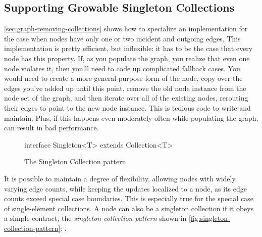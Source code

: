 \subsection{Supporting Growable Singleton Collections}

\autoref{sec:graph-removing-collections} shows how to specialize an
implementation for the case when nodes have only one or two incident and
outgoing edges. This implementation is pretty efficient, but inflexible: it has
to be the case that every node has this property. If, as you populate the graph,
you realize that even one node violates it, then you'll need to code up
complicated fallback cases. You would need to create a more general-purpose form
of the node, copy over the edges you've added up until this point, remove the
old node instance from the node set of the graph, and then iterate over all of
the existing nodes, rerouting their edges to point to the new node instance.
This is tedious code to write and maintain. Plus, if this happens even
moderately often while populating the graph, can result in bad performance.


\begin{figure}
\centering
\begin{framedlisting}
interface Singleton<T> extends Collection<T> {
}
\end{framedlisting}
\caption{The Singleton Collection pattern.}
\label{fig:singleton-collection-pattern}
\end{figure}
It is possible to maintain a degree of flexibility, allowing nodes with
widely varying edge counts, while keeping the updates localized to a node, as
its edge counts exceed special case boundaries. This is especially true for the
special case of single-element collections.
A node can also be a singleton collection if it obeys a simple
contract, the \emph{singleton collection pattern} shown in
\autoref{fig:singleton-collection-pattern}: .

